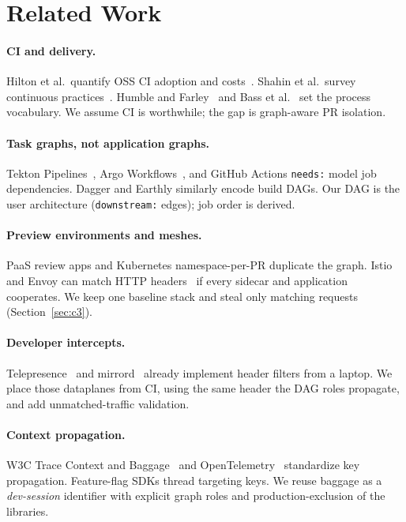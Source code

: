 \documentclass[10pt,conference]{IEEEtran}
\begin{document}
\section{Related Work}
\label{sec:rw}

\paragraph{CI and delivery.}
Hilton et al.\ quantify OSS CI adoption and costs~\cite{hilton2016usage,hilton2017tradeoffs}. Shahin et al.\ survey continuous practices~\cite{shahin2017continuous}. Humble and Farley~\cite{humble2010continuous} and Bass et al.~\cite{bass2015devops} set the process vocabulary. We assume CI is worthwhile; the gap is graph-aware PR isolation.

\paragraph{Task graphs, not application graphs.}
Tekton Pipelines~\cite{tekton}, Argo Workflows~\cite{argoworkflows}, and GitHub Actions \texttt{needs:} model job dependencies. Dagger and Earthly similarly encode build DAGs. Our DAG is the user architecture (\texttt{downstream:} edges); job order is derived.

\paragraph{Preview environments and meshes.}
PaaS review apps and Kubernetes namespace-per-PR duplicate the graph. Istio and Envoy can match HTTP headers~\cite{istio} if every sidecar and application cooperates. We keep one baseline stack and steal only matching requests (Section~\ref{sec:c3}).

\paragraph{Developer intercepts.}
Telepresence~\cite{telepresence} and mirrord~\cite{mirrord} already implement header filters from a laptop. We place those dataplanes from CI, using the same header the DAG roles propagate, and add unmatched-traffic validation.

\paragraph{Context propagation.}
W3C Trace Context and Baggage~\cite{w3cbaggage} and OpenTelemetry~\cite{opentelemetry} standardize key propagation. Feature-flag SDKs thread targeting keys. We reuse baggage as a \emph{dev-session} identifier with explicit graph roles and production-exclusion of the libraries.
\end{document}
